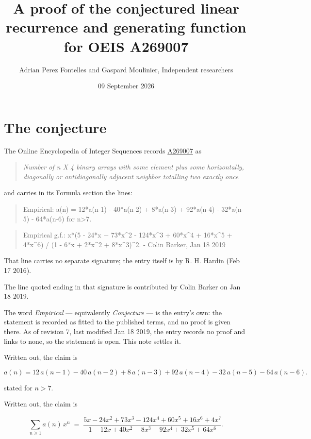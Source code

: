 \documentclass[11pt]{article}
\title{A proof of the conjectured linear recurrence and generating function for OEIS A269007}
\author{Adrian Perez Fontelles and Gaspard Moulinier, Independent researchers}
\date{09 September 2026}
\theoremstyle{definition}
\begin{document}
\maketitle
\section{The conjecture}

The Online Encyclopedia of Integer Sequences records \href{https://oeis.org/A269007}{A269007} as

\begin{quote}\itshape Number of n X 4 binary arrays with some element plus some horizontally, diagonally or antidiagonally adjacent neighbor totalling two exactly once\end{quote}

and carries in its Formula section the lines:

\begin{quote}\ttfamily Empirical: a(n) = 12*a(n-1) - 40*a(n-2) + 8*a(n-3) + 92*a(n-4) - 32*a(n-5) - 64*a(n-6) for n>7.\end{quote}

\begin{quote}\ttfamily Empirical g.f.: x*(5 - 24*x + 73*x\textasciicircum{}2 - 124*x\textasciicircum{}3 + 60*x\textasciicircum{}4 + 16*x\textasciicircum{}5 + 4*x\textasciicircum{}6) / (1 - 6*x + 2*x\textasciicircum{}2 + 8*x\textasciicircum{}3)\textasciicircum{}2. - Colin Barker, Jan 18 2019\end{quote}

That line carries no separate signature; the entry itself is by R. H. Hardin (Feb 17 2016).

The line quoted ending in that signature is contributed by Colin Barker on Jan 18 2019.

The word {\itshape Empirical} --- equivalently {\itshape Conjecture} --- is the entry's own: the statement is recorded as fitted to the published terms, and no proof is given there. As of revision 7, last modified Jan 18 2019, the entry records no proof and links to none, so the statement is open. This note settles it.

Written out, the claim is

\[a(n) = 12\,a(n-1) - 40\,a(n-2) + 8\,a(n-3) + 92\,a(n-4) - 32\,a(n-5) - 64\,a(n-6).\]

stated for $n > 7$.

Written out, the claim is

\[\sum_{n \ge 1} a(n)\,x^n \;=\; \frac{5x - 24x^{2} + 73x^{3} - 124x^{4} + 60x^{5} + 16x^{6} + 4x^{7}}{1 - 12x + 40x^{2} - 8x^{3} - 92x^{4} + 32x^{5} + 64x^{6}}.\]
\end{document}

